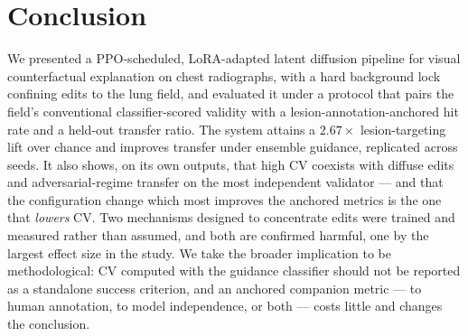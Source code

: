 \documentclass[10pt,twocolumn,letterpaper]{article}
\begin{document}
\section{Conclusion}

We presented a PPO-scheduled, LoRA-adapted latent diffusion pipeline for
visual counterfactual explanation on chest radiographs, with a hard
background lock confining edits to the lung field, and evaluated it
under a protocol that pairs the field's conventional classifier-scored
validity with a lesion-annotation-anchored hit rate and a held-out
transfer ratio. The system attains a $2.67\times$ lesion-targeting lift
over chance and improves transfer under ensemble guidance, replicated
across seeds. It also shows, on its own outputs, that high CV coexists
with diffuse edits and adversarial-regime transfer on the most
independent validator --- and that the configuration change which most
improves the anchored metrics is the one that \emph{lowers} CV. Two
mechanisms designed to concentrate edits were trained and measured rather
than assumed, and both are confirmed harmful, one by the largest effect
size in the study. We take the broader implication to be methodological:
CV computed with the guidance classifier should not be reported as a
standalone success criterion, and an anchored companion metric --- to
human annotation, to model independence, or both --- costs little and
changes the conclusion.

{
    \small
    
    
}
\end{document}
